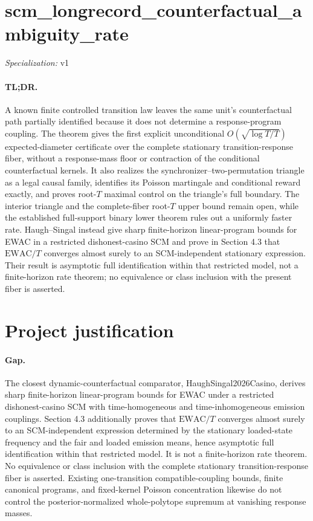 \documentclass{article}
\begin{document}
\sloppy

\section*{scm\_\allowbreak{}longrecord\_\allowbreak{}counterfactual\_\allowbreak{}ambiguity\_\allowbreak{}rate}

\noindent\textit{Specialization:} v1\par

\paragraph{TL;DR.} A known finite controlled transition law leaves the same unit's counterfactual path partially identified because it does not determine a response-program coupling. The theorem gives the first explicit unconditional \(O(\sqrt{\log T/T})\) expected-diameter certificate over the complete stationary transition-response fiber, without a response-mass floor or contraction of the conditional counterfactual kernels. It also realizes the synchronizer--two-permutation triangle as a legal causal family, identifies its Poisson martingale and conditional reward exactly, and proves root-\(T\) maximal control on the triangle's full boundary. The interior triangle and the complete-fiber root-\(T\) upper bound remain open, while the established full-support binary lower theorem rules out a uniformly faster rate. Haugh--Singal instead give sharp finite-horizon linear-program bounds for EWAC in a restricted dishonest-casino SCM and prove in Section 4.3 that \(\mathrm{EWAC}/T\) converges almost surely to an SCM-independent stationary expression. Their result is asymptotic full identification within that restricted model, not a finite-horizon rate theorem; no equivalence or class inclusion with the present fiber is asserted.

\section{Project justification}

\paragraph{Gap.} The closest dynamic-counterfactual comparator, HaughSingal2026Casino, derives sharp finite-horizon linear-program bounds for EWAC under a restricted dishonest-casino SCM with time-homogeneous and time-inhomogeneous emission couplings. Section 4.3 additionally proves that \(\mathrm{EWAC}/T\) converges almost surely to an SCM-independent expression determined by the stationary loaded-state frequency and the fair and loaded emission means, hence asymptotic full identification within that restricted model. It is not a finite-horizon rate theorem. No equivalence or class inclusion with the complete stationary transition-response fiber is asserted. Existing one-transition compatible-coupling bounds, finite canonical programs, and fixed-kernel Poisson concentration likewise do not control the posterior-normalized whole-polytope supremum at vanishing response masses.
\end{document}
